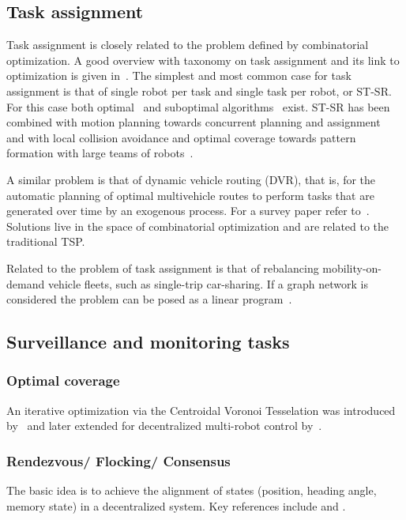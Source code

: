 
\subsection{Task assignment}

Task assignment is closely related to the problem defined by combinatorial optimization.
A good overview with taxonomy on task assignment and its link to optimization is given in~\cite{Gerkey:2004il}. The simplest and most common case for task assignment is that of single robot per task and single task per robot, or ST-SR. For this case both optimal~\cite{kuhn55} and suboptimal algorithms~\cite{Bertsekas:1992wx} exist.
ST-SR has been combined with motion planning towards concurrent planning and assignment~\cite{Turpin:2014bu} and with local collision avoidance and optimal coverage towards pattern formation with large teams of robots~\cite{alonsomora12ijrr}.

A similar problem is that of dynamic vehicle routing (DVR), that is, for the automatic planning of optimal multivehicle routes to perform tasks that are generated over time by an exogenous process. For a survey paper refer to~\cite{Bullo.Frazzoli.ea:PIEEE10}. Solutions live in the space of combinatorial optimization and are related to the traditional TSP.

Related to the problem of task assignment is that of rebalancing mobility-on-demand vehicle fleets, such as single-trip car-sharing. If a graph network is considered the problem can be posed as a linear program~\cite{Smith:2013fa}.

\subsection{Surveillance and monitoring tasks}

\subsubsection{Optimal coverage}
An iterative optimization via the Centroidal Voronoi Tesselation was introduced by~\cite{cortes04} and later extended for decentralized multi-robot control by~\cite{Schwager:2009fz}.

\subsubsection{Rendezvous/ Flocking/ Consensus} The basic idea is to achieve the alignment of states (position, heading angle, memory state) in a decentralized system. Key references include \cite{Cortes.Martinez.ea:06} and \cite{Jadbabaie.Lin.ea:03}.

